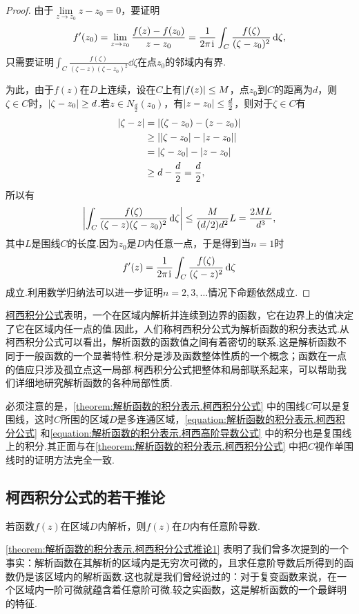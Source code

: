 \begin{theorem}
\begin{proof}
由于\(\lim\limits_{z \to z_0} z-z_0 = 0\)，要证明\[
f'(z_0) = \lim\limits_{z \to z_0} \frac{f(z)-f(z_0)}{z-z_0}
= \frac{1}{2\pi\kern1pt\mathrm{i}\kern1pt} \int_C{\frac{f(\zeta)}{(\zeta-z_0)^2}\dd{\zeta}},
\]只需要证明\(\int_C{\frac{f(\zeta)}{(\zeta-z)(\zeta-z_0)^2}\dd{\zeta}}\)在点\(z_0\)的邻域内有界.

为此，由于\(f(z)\)在\(\overline{D}\)上连续，设在\(C\)上有\(\abs{f(z)} \leq M\)，点\(z_0\)到\(C\)的距离为\(d\)，则\(\zeta \in C\)时，\(\abs{\zeta-z_0} \geq d\).若\(z \in N_{\frac{d}{2}}(z_0)\)，有\(\abs{z-z_0} \leq \frac{d}{2}\)，则对于\(\zeta \in C\)有\begin{align*}
\abs{\zeta-z}
&= \abs{(\zeta-z_0)-(z-z_0)} \\
&\geq \abs{ \abs{\zeta-z_0} - \abs{z-z_0} } \\
&= \abs{\zeta-z_0} - \abs{z-z_0} \\
&\geq d - \frac{d}{2} = \frac{d}{2},
\end{align*}
所以有\[
\abs{
 \int_C{\frac{f(\zeta)}{(\zeta-z)(\zeta-z_0)^2}\dd{\zeta}}
 } \leq \frac{M}{(d/2) d^2} L
= \frac{2ML}{d^3},
\]其中\(L\)是围线\(C\)的长度.因为\(z_0\)是\(D\)内任意一点，于是得到当\(n=1\)时\[
f'(z) = \frac{1}{2\pi\kern1pt\mathrm{i}\kern1pt} \int_C{\frac{f(\zeta)}{(\zeta-z)^2}\dd{\zeta}}
\]成立.利用数学归纳法可以进一步证明\(n=2,3,\dots\)情况下命题依然成立.
\end{proof}
\end{theorem}

\hyperref[equation:解析函数的积分表示.柯西积分公式]{柯西积分公式}表明，一个在区域内解析并连续到边界的函数，它在边界上的值决定了它在区域内任一点的值.因此，人们称柯西积分公式为解析函数的积分表达式.从柯西积分公式可以看出，解析函数的函数值之间有着密切的联系.这是解析函数不同于一般函数的一个显著特性.积分是涉及函数整体性质的一个概念；函数在一点的值应只涉及孤立点这一局部.柯西积分公式把整体和局部联系起来，可以帮助我们详细地研究解析函数的各种局部性质.

必须注意的是，\cref{theorem:解析函数的积分表示.柯西积分公式} 中的围线\(C\)可以是复围线，这时\(C\)所围的区域\(D\)是多连通区域，\cref{equation:解析函数的积分表示.柯西积分公式} 和\cref{equation:解析函数的积分表示.柯西高阶导数公式} 中的积分也是复围线上的积分.其正面与在\cref{theorem:解析函数的积分表示.柯西积分公式} 中把\(C\)视作单围线时的证明方法完全一致.

\subsection{柯西积分公式的若干推论}
\begin{corollary}\label{theorem:解析函数的积分表示.柯西积分公式推论1}
若函数\(f(z)\)在区域\(D\)内解析，则\(f(z)\)在\(D\)内有任意阶导数.
\end{corollary}
\cref{theorem:解析函数的积分表示.柯西积分公式推论1} 表明了我们曾多次提到的一个事实：解析函数在其解析的区域内是无穷次可微的，且求任意阶导数后所得到的函数仍是该区域内的解析函数.这也就是我们曾经说过的：对于复变函数来说，在一个区域内一阶可微就蕴含着任意阶可微.较之实函数，这是解析函数的一个最鲜明的特征.

